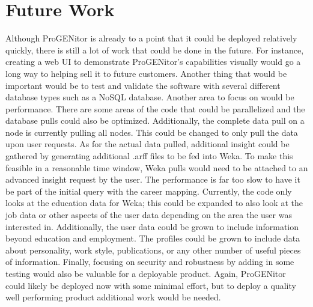 \section{Future Work}
\label{sect:future-work}
Although ProGENitor is already to a point that it could be deployed relatively
quickly, there is still a lot of work that could be done in the future.  For
instance, creating a web UI to demonstrate ProGENitor's capabilities visually
would go a long way to helping sell it to future customers.  Another thing that
would be important would be to test and validate the software with several
different database types such as a NoSQL database.  Another area to focus on
would be performance.  There are some areas of the code that could be
parallelized and the database pulls could also be optimized.  Additionally, the
complete data pull on a node is currently pulling all nodes.  This could be
changed to only pull the data upon user requests.  As for the actual data
pulled, additional insight could be gathered by generating additional .arff
files to be fed into Weka.  To make this feasible in a reasonable time window,
Weka pulls would need to be attached to an advanced insight request by the user.
The performance is far too slow to have it be part of the initial query with the
career mapping. Currently, the code only looks at the education data for Weka;
this could be expanded to also look at the job data or other aspects of the user
data depending on the area the user was interested in.  Additionally, the user
data could be grown to include information beyond education and employment.  The
profiles could be grown to include data about personality, work style,
publications, or any other number of useful pieces of information.  Finally,
focusing on security and robustness by adding in some testing would also be
valuable for a deployable product.  Again, ProGENitor could likely be deployed
now with some minimal effort, but to deploy a quality well performing product
additional work would be needed.
